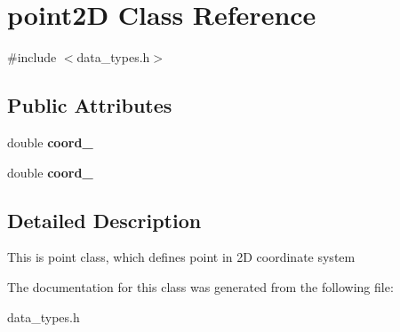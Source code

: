 \hypertarget{classpoint2_d}{}\section{point2D Class Reference}
\label{classpoint2_d}


{\ttfamily \#include $<$data\+\_\+types.\+h$>$}

\subsection*{Public Attributes}
\begin{DoxyCompactItemize}
\item 
\mbox{\label{classpoint2_d_a7d8e81264084718bd0aab42f9d60240b}} 
double {\bfseries coord\+\_}
\item 
\mbox{\label{classpoint2_d_a9c1d3498718dc955e339ae49ebe9772c}} 
double {\bfseries coord\+\_}
\end{DoxyCompactItemize}


\subsection{Detailed Description}
This is point class, which defines point in 2D coordinate system 

The documentation for this class was generated from the following file\+:\begin{DoxyCompactItemize}
\item 
data\+\_\+types.\+h\end{DoxyCompactItemize}
